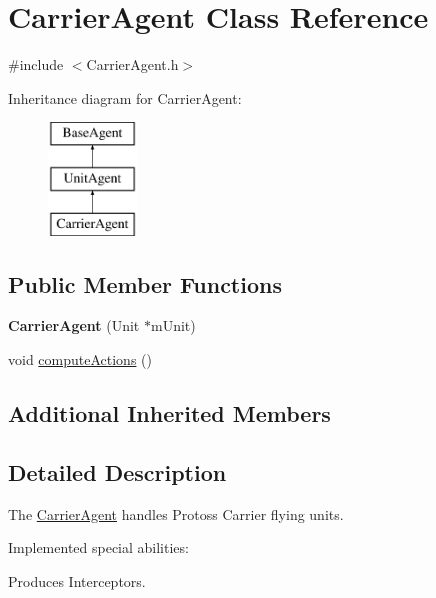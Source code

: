 \hypertarget{class_carrier_agent}{\section{Carrier\-Agent Class Reference}
\label{class_carrier_agent}
}


{\ttfamily \#include $<$Carrier\-Agent.\-h$>$}

Inheritance diagram for Carrier\-Agent\-:\begin{figure}[H]
\begin{center}
\leavevmode
\includegraphics[height=3.000000cm]{class_carrier_agent}
\end{center}
\end{figure}
\subsection*{Public Member Functions}
\begin{DoxyCompactItemize}
\item 
\hypertarget{class_carrier_agent_a20ce5b087df422d005f7affee26f82b7}{{\bfseries Carrier\-Agent} (Unit $\ast$m\-Unit)}\label{class_carrier_agent_a20ce5b087df422d005f7affee26f82b7}

\item 
void \hyperlink{class_carrier_agent_ae27c99321285fe3490bfed94d3192b3c}{compute\-Actions} ()
\end{DoxyCompactItemize}
\subsection*{Additional Inherited Members}


\subsection{Detailed Description}
The \hyperlink{class_carrier_agent}{Carrier\-Agent} handles Protoss Carrier flying units.

Implemented special abilities\-:
\begin{DoxyItemize}
\item Produces Interceptors.
\end{DoxyItemize}

